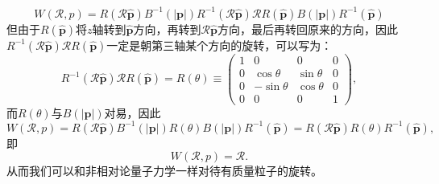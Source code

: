 \begin{equation*}
	W(\mathcal{R} ,p)=R(\mathcal{R}\hat{\boldsymbol{p}} )B^{-1} (|\boldsymbol{p} |)R^{-1} (\mathcal{R}\hat{\boldsymbol{p}} )\mathcal{R} R(\hat{\boldsymbol{p}} )B(|\boldsymbol{p} |)R^{-1} (\hat{\boldsymbol{p}} )
\end{equation*}
但由于$R(\hat{\boldsymbol{p}})$将$z$轴转到$\hat{\boldsymbol{p}}$方向，再转到$\mathcal{R}\hat{\boldsymbol{p}}$方向，最后再转回原来的方向，因此$R^{-1} (\mathcal{R}\hat{\boldsymbol{p}} )\mathcal{R} R(\hat{\boldsymbol{p}} )$一定是朝第三轴某个方向的旋转，可以写为：
\begin{equation*}
	R^{-1} (\mathcal{R}\hat{\boldsymbol{p}} )\mathcal{R} R(\hat{\boldsymbol{p}} )=R(\theta )\equiv \begin{pmatrix}
		1 & 0 & 0 & 0\\
		0 & \cos \theta  & \sin \theta  & 0\\
		0 & -\sin \theta  & \cos \theta  & 0\\
		0 & 0 & 0 & 1
	\end{pmatrix} ,
\end{equation*}
而$R(\theta )$与$B(| \boldsymbol{p}| )$对易，因此
\begin{equation*}
	W(\mathcal{R} ,p)=R(\mathcal{R}\hat{\boldsymbol{p}} )B^{-1} (|\boldsymbol{p} |)R(\theta )B(|\boldsymbol{p} |)R^{-1} (\hat{\boldsymbol{p}} )=R(\mathcal{R}\hat{\boldsymbol{p}} )R(\theta )R^{-1} (\hat{\boldsymbol{p}} ),
\end{equation*}
即
\begin{equation*}
	W(\mathcal{R} ,p)=\mathcal{R} .
\end{equation*}
从而我们可以和非相对论量子力学一样对待有质量粒子的旋转。

